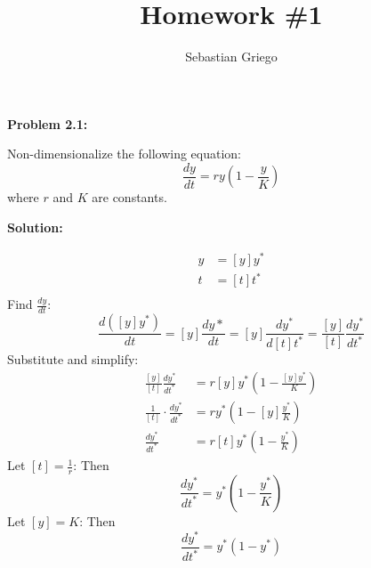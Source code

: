 \documentclass[12pt]{article}
\newenvironment{problem}[1]{
\textbf{Problem #1:}
}{
\rmfamily \vspace{1em}
}
\newenvironment{solution}{
\textbf{Solution:}

}{

\vspace{2em}
}
\begin{document}
\title{Homework \#1}  %
\author{Sebastian Griego}  %

\begin{problem}{2.1}
    Non-dimensionalize the following equation:
    \[
        \frac{dy}{dt} = ry(1-\frac{y}{K})
    \]
    where \(r\) and \(K\) are constants.
\end{problem}

\begin{solution}
    \[
        \begin{aligned}
            y &= [y]y^* \\
            t &= [t]t^* \\
        \end{aligned}
    \]
    Find \(\frac{dy}{dt}\):
    \[
        \frac{d([y]y^*)}{dt} = [y]\frac{dy*}{dt} = [y]\frac{dy^*}{d[t]t^*} = \frac{[y]}{[t]} \frac{dy^*}{dt^*}
    \]
    Substitute and simplify:
    \[
        \begin{aligned}
            \frac{[y]}{[t]} \frac{dy^*}{dt^*} &= r[y]y^*(1-\frac{[y]y^*}{K}) \\
            \frac{1}{[t]} \cdot \frac{dy^*}{dt^*} &= r y^*(1-[y]\frac{y^*}{K}) \\
            \frac{dy^*}{dt^*} &= r[t] y^*(1-\frac{y^*}{K})
        \end{aligned}
    \]
    Let \([t] = \frac{1}{r}\):
    Then
    \[
        \frac{dy^*}{dt^*} = y^*(1-\frac{y^*}{K})
    \]
    Let \([y] = K\):
    Then
    \[
        \frac{dy^*}{dt^*} = y^*(1-y^*)
    \]
\end{solution}
\end{document}
